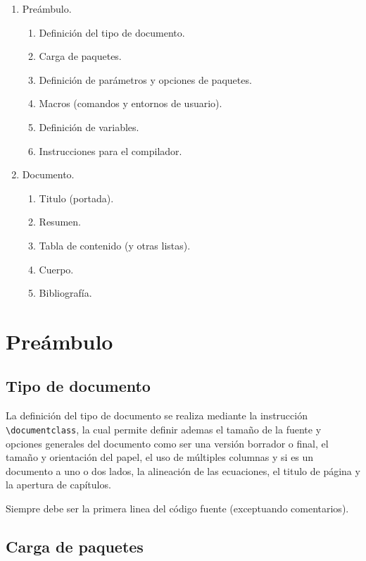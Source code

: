 \documentclass[12pt]{article}
\begin{document}
\begin{enumerate}
\item Preámbulo.
	\begin{enumerate}
	\item Definición del tipo de documento.
	\item Carga de paquetes.
	\item Definición de parámetros y opciones de paquetes.
	\item Macros (comandos y entornos de usuario).
	\item Definición de variables.
	\item Instrucciones para el compilador.
	\end{enumerate}
\item Documento.
	\begin{enumerate}
	\item Titulo (portada).
	\item Resumen.
	\item Tabla de contenido (y otras listas).
	\item Cuerpo.
	\item Bibliografía.
	\end{enumerate}
\end{enumerate}

\section{Preámbulo}

\subsection{Tipo de documento}

La definición del tipo de documento se realiza mediante la instrucción \verb-\documentclass-, la cual permite definir ademas el tamaño de la fuente y opciones generales del documento como ser una versión borrador o final, el tamaño y orientación del papel, el uso de múltiples columnas y si es un documento a uno o dos lados, la alineación de las ecuaciones, el titulo de página y la apertura de capítulos.

Siempre debe ser la primera linea del código fuente (exceptuando comentarios).

\subsection{Carga de paquetes}
\end{document}
